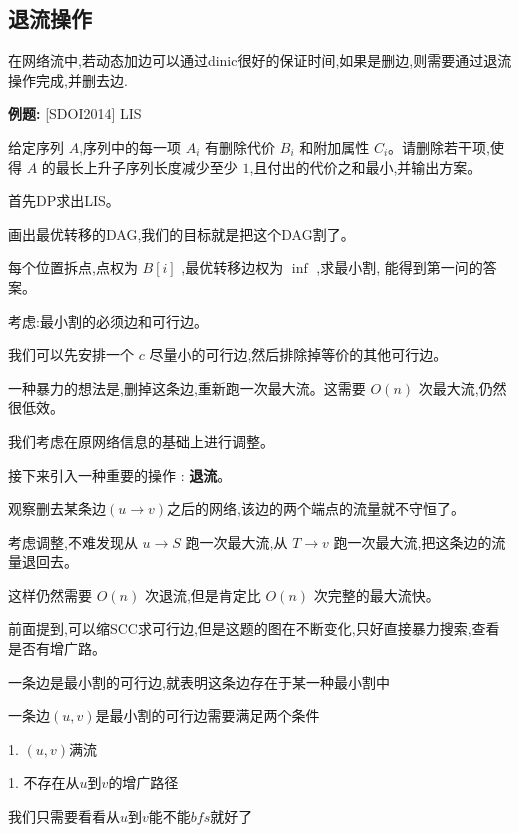 \documentclass[a4paper]{ctexart}
\begin{document}
\subsection{退流操作}

在网络流中,若动态加边可以通过dinic很好的保证时间,如果是删边,则需要通过退流操作完成,并删去边.

\textbf{例题:}
[SDOI2014] LIS

给定序列 $A$,序列中的每一项 $A_i$ 有删除代价 $B_i$ 和附加属性 $C_i$。请删除若干项,使得 $A$ 的最长上升子序列长度减少至少 $1$,且付出的代价之和最小,并输出方案。

首先DP求出LIS。

画出最优转移的DAG,我们的目标就是把这个DAG割了。

每个位置拆点,点权为 $B[i]$ ,最优转移边权为 $\inf$ ,求最小割, 能得到第一问的答案。

考虑:最小割的必须边和可行边。

我们可以先安排一个 $c$ 尽量小的可行边,然后排除掉等价的其他可行边。

一种暴力的想法是,删掉这条边,重新跑一次最大流。这需要 $O(n)$ 次最大流,仍然很低效。

我们考虑在原网络信息的基础上进行调整。

接下来引入一种重要的操作 : \textbf{退流}。

观察删去某条边$(u\rightarrow v)$之后的网络,该边的两个端点的流量就不守恒了。

考虑调整,不难发现从 $u\rightarrow S$ 跑一次最大流,从 $T\rightarrow v$ 跑一次最大流,把这条边的流量退回去。

这样仍然需要 $O(n)$ 次退流,但是肯定比 $O(n)$ 次完整的最大流快。

前面提到,可以缩SCC求可行边,但是这题的图在不断变化,只好直接暴力搜索,查看是否有增广路。

一条边是最小割的可行边,就表明这条边存在于某一种最小割中

一条边$(u,v)$是最小割的可行边需要满足两个条件

1. $(u,v)$满流

1. 不存在从$u$到$v$的增广路径

我们只需要看看从$u$到$v$能不能$bfs$就好了
\end{document}
